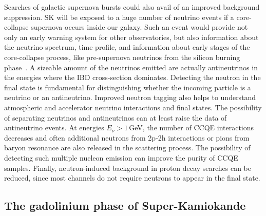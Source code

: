 Searches of galactic supernova bursts could also avail of an improved background suppression.
SK will be exposed to a huge number of neutrino events if a core-collapse supernova occurs inside our galaxy.
Such an event would provide not only an early warning system for other observatories, %
but also information about the neutrino spectrum, time profile, and information about early stages of the core-collapse process, %
like pre-supernova neutrinos from the silicon burning phase~\cite{Simpson:2019xwo}.
A sizeable amount of the neutrinos emitted are actually antineutrinos in the energies where the IBD cross-section dominates.
Detecting the neutron in the final state is fundamental for distinguishing whether the incoming particle is %
a neutrino or an antineutrino.
Improved neutron tagging also helps to understand atmospheric and accelerator neutrino interactions and final states.
The possibility of separating neutrinos and antineutrinos can at least raise the data of antineutrino events. %
At energies $E_\nu > 1$\,GeV, the number of CCQE interactions decreases and often additional neutrons %
from 2p-2h interactions or pions from baryon resonance are also released in the scattering process.
The possibility of detecting such multiple nucleon emission can improve the purity of CCQE samples.
Finally, neutron-induced background in proton decay searches can be reduced, %
since most channels do not require neutrons to appear in the final state.



\subsection{The gadolinium phase of Super-Kamiokande}
\label{sec:gadolinium}

